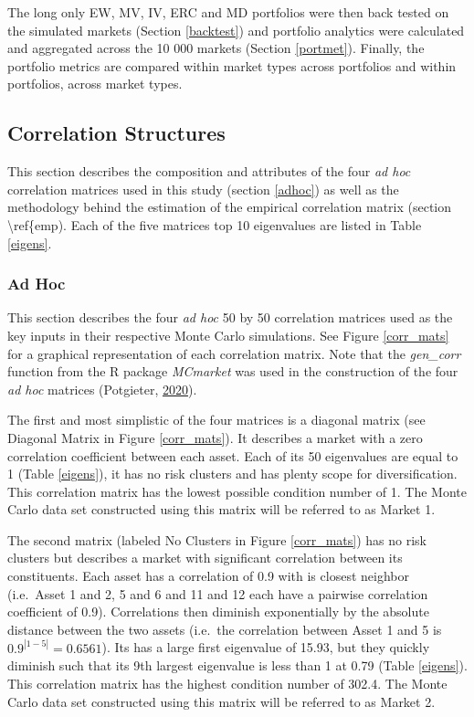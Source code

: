 \documentclass[11pt,preprint, authoryear]{elsarticle}
\numberwithin{equation}{section}
\numberwithin{figure}{section}
\numberwithin{table}{section}
\begin{document}
The long only EW, MV, IV, ERC and MD portfolios were then back tested on
the simulated markets (Section \ref{backtest}) and portfolio analytics
were calculated and aggregated across the 10 000 markets (Section
\ref{portmet}). Finally, the portfolio metrics are compared within
market types across portfolios and within portfolios, across market
types.

\hypertarget{correlation-structures}{%
\subsection{\texorpdfstring{Correlation Structures
\label{corr_struc}}{Correlation Structures }}\label{correlation-structures}}

This section describes the composition and attributes of the four
\emph{ad hoc} correlation matrices used in this study (section
\ref{adhoc}) as well as the methodology behind the estimation of the
empirical correlation matrix (section \textbackslash ref\{emp). Each of
the five matrices top 10 eigenvalues are listed in Table \ref{eigens}.

\hypertarget{ad-hoc}{%
\subsubsection{\texorpdfstring{Ad Hoc
\label{adhoc}}{Ad Hoc }}\label{ad-hoc}}

This section describes the four \emph{ad hoc} 50 by 50 correlation
matrices used as the key inputs in their respective Monte Carlo
simulations. See Figure \ref{corr_mats} for a graphical representation
of each correlation matrix. Note that the \emph{gen\_corr} function from
the R package \emph{MCmarket} was used in the construction of the four
\emph{ad hoc} matrices (Potgieter,
\protect\hyperlink{ref-MCmarket}{2020}).

The first and most simplistic of the four matrices is a diagonal matrix
(see Diagonal Matrix in Figure \ref{corr_mats}). It describes a market
with a zero correlation coefficient between each asset. Each of its 50
eigenvalues are equal to 1 (Table \ref{eigens}), it has no risk clusters
and has plenty scope for diversification. This correlation matrix has
the lowest possible condition number of 1. The Monte Carlo data set
constructed using this matrix will be referred to as Market 1.

The second matrix (labeled No Clusters in Figure \ref{corr_mats}) has no
risk clusters but describes a market with significant correlation
between its constituents. Each asset has a correlation of 0.9 with is
closest neighbor (i.e.~Asset 1 and 2, 5 and 6 and 11 and 12 each have a
pairwise correlation coefficient of 0.9). Correlations then diminish
exponentially by the absolute distance between the two assets (i.e.~the
correlation between Asset 1 and 5 is \(0.9^{|1-5|}=0.6561\)). Its has a
large first eigenvalue of 15.93, but they quickly diminish such that its
9th largest eigenvalue is less than 1 at 0.79 (Table \ref{eigens}). This
correlation matrix has the highest condition number of 302.4. The Monte
Carlo data set constructed using this matrix will be referred to as
Market 2.
\end{document}

